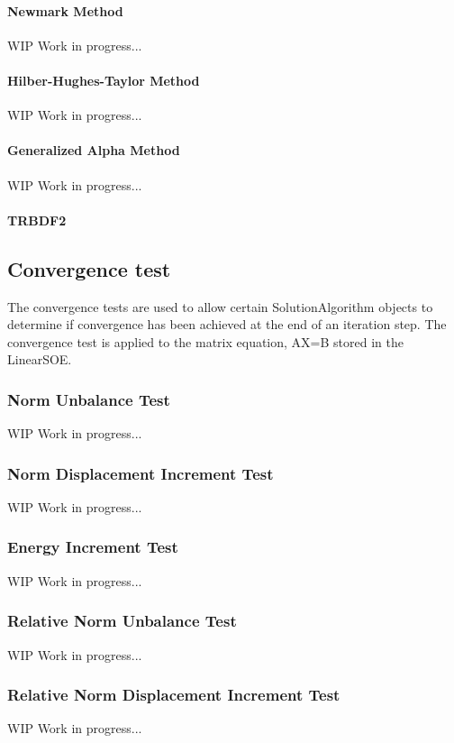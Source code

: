 \paragraph{Newmark Method}
WIP Work in progress...

\paragraph{Hilber-Hughes-Taylor Method}
WIP Work in progress...

\paragraph{Generalized Alpha Method}
WIP Work in progress...

\paragraph{TRBDF2}
    
\subsection{Convergence test}
The convergence tests are used to allow certain SolutionAlgorithm objects to determine if convergence has been achieved at the end of an iteration step. The convergence test is applied to the matrix equation, AX=B stored in the LinearSOE.



\subsubsection{Norm Unbalance Test}
WIP Work in progress...

\subsubsection{Norm Displacement Increment Test}
WIP Work in progress...

\subsubsection{Energy Increment Test}
WIP Work in progress...

\subsubsection{Relative Norm Unbalance Test}
WIP Work in progress...

\subsubsection{Relative Norm Displacement Increment Test}
WIP Work in progress...

